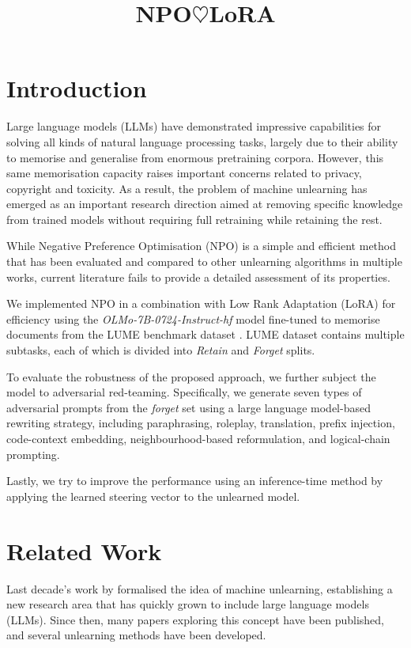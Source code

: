 \documentclass[10pt, a4paper]{article}
\title{NPO$\heartsuit$LoRA}
\begin{document}
\maketitleabstract

\section{Introduction}

Large language models (LLMs) have demonstrated impressive capabilities for solving all kinds of natural language processing tasks, largely due to their ability to memorise and generalise from enormous pretraining corpora. However, this same memorisation capacity raises important concerns related to privacy, copyright and toxicity. As a result, the problem of machine unlearning has emerged as an important research direction aimed at removing specific knowledge from trained models without requiring full retraining while retaining the rest.

While Negative Preference Optimisation (NPO) \citep{zhang2024negative} is a simple and efficient method that has been evaluated and compared to other unlearning algorithms in multiple works, current literature fails to provide a detailed assessment of its properties. 

We implemented NPO in a combination with Low Rank Adaptation (LoRA) for efficiency using the \textit{OLMo-7B-0724-Instruct-hf} model \cite{groeneveld2024olmo} fine-tuned to memorise documents from the LUME benchmark dataset \cite{ramakrishna2025lumellmunlearningmultitask}. LUME dataset contains multiple subtasks, each of which is divided into \textit{Retain} and \textit{Forget} splits.

To evaluate the robustness of the proposed approach, we further subject the model to adversarial red-teaming. Specifically, we generate seven types of adversarial prompts from the \textit{forget} set using a large language model-based rewriting strategy, including paraphrasing, roleplay, translation, prefix injection, code-context embedding, neighbourhood-based reformulation, and logical-chain prompting.

Lastly, we try to improve the performance using an inference-time method by applying the learned steering vector to the unlearned model.

\section{Related Work}

Last decade's work by \citet{cao2015towards} formalised the idea of machine unlearning, establishing a new research area that has quickly grown to include large language models (LLMs). Since then, many papers exploring this concept have been published, and several unlearning methods have been developed.
\end{document}
